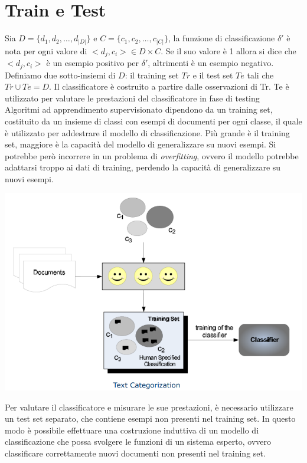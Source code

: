 \documentclass{report}
\begin{document}
	\section{Train e Test}
	Sia $D = \{d_1, d_2, \ldots, d_{|D|}\}$ e $C = \{c_1, c_2, \ldots, c_{|C|}\}$, la funzione di classificazione $\delta'$ è nota per ogni valore di $<d_j, c_i> \in D \times C$. Se il suo valore è 1 allora si dice che $<d_j, c_i>$ è un esempio positivo per $\delta'$, altrimenti è un esempio negativo.\\  
	Definiamo due sotto-insiemi di $D$: il training set $Tr$ e il test set $Te$ tali che $Tr \cup Te = D$. Il classificatore è costruito a partire dalle osservazioni di Tr. Te è utilizzato per valutare le prestazioni del classificatore in fase di testing
	\vspace{\baselineskip}\\
	Algoritmi ad apprendimento supervisionato dipendono da un training set, costituito da un insieme di classi con esempi di documenti per ogni classe, il quale è utilizzato per addestrare il modello di classificazione. Più grande è il training set, maggiore è la capacità del modello di generalizzare su nuovi esempi. Si potrebbe però incorrere in un problema di \textit{overfitting}, ovvero il modello potrebbe adattarsi troppo ai dati di training, perdendo la capacità di generalizzare su nuovi esempi. 
	\begin{center}
		\includegraphics[scale=0.3]{assets/supervised-learning-training.png}
	\end{center}
	Per valutare il classificatore e misurare le sue prestazioni, è necessario utilizzare un test set separato, che contiene esempi non presenti nel training set. In questo modo è possibile effettuare una costruzione induttiva di un modello di classificazione che possa svolgere le funzioni di un sistema esperto, ovvero classificare correttamente nuovi documenti non presenti nel training set. 
\end{document}
